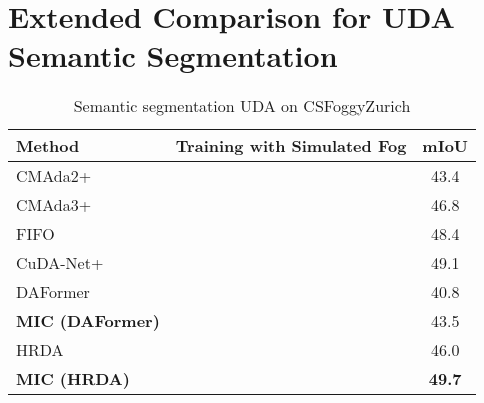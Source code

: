 \documentclass[10pt,twocolumn,letterpaper]{article}
\newcommand*{\cm}{\checkmark}
\begin{document}
\section{Extended Comparison for UDA Semantic Segmentation}
\label{sec:supp_extended_sota}

\begin{table}
    \centering
    \caption{Semantic segmentation UDA on CSFoggyZurich}
    \label{tab:sota_foggyzurich}
    \setlength{\tabcolsep}{2.4pt}
    \scriptsize
    \begin{tabular}{lcc}
    \toprule
    Method                            & Training with Simulated Fog & mIoU \\
    \midrule
    CMAda2+~\cite{dai2020curriculum}  & \cm & 43.4 \\
    CMAda3+~\cite{dai2020curriculum}  & \cm & 46.8 \\
    FIFO~\cite{lee2022fifo}           & \cm & 48.4 \\
    CuDA-Net+~\cite{ma2022both}       & \cm & 49.1 \\
    \midrule
    DAFormer~\cite{hoyer2021daformer} & & 40.8 \\
    \textbf{MIC (DAFormer)}            & & 43.5 \\
    HRDA~\cite{hoyer2022hrda}         & & 46.0 \\
    \textbf{MIC (HRDA)}                & & \textbf{49.7} \\
    \bottomrule
    \end{tabular}
\end{table} 
\end{document}
